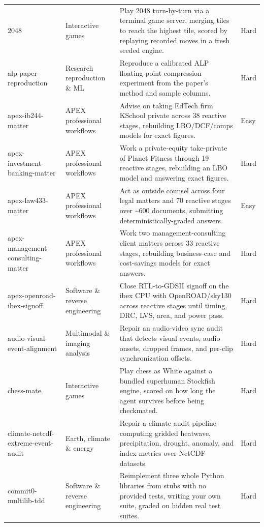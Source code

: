 \begin{longtable}{p{}p{}p{}p{}}
2048 & Interactive games & Play 2048 turn-by-turn via a terminal game server, merging tiles to reach the highest tile, scored by replaying recorded moves in a fresh seeded engine. & Hard \\
alp-paper-reproduction & Research reproduction \& ML & Reproduce a calibrated ALP floating-point compression experiment from the paper's method and sample columns. & Hard \\
apex-ib244-matter & APEX professional workflows & Advise on taking EdTech firm KSchool private across 38 reactive stages, rebuilding LBO/DCF/comps models for exact figures. & Easy \\
apex-investment-banking-matter & APEX professional workflows & Work a private-equity take-private of Planet Fitness through 19 reactive stages, rebuilding an LBO model and answering exact figures. & Hard \\
apex-law433-matter & APEX professional workflows & Act as outside counsel across four legal matters and 70 reactive stages over \textasciitilde{}600 documents, submitting deterministically-graded answers. & Easy \\
apex-management-consulting-matter & APEX professional workflows & Work two management-consulting client matters across 33 reactive stages, rebuilding business-case and cost-savings models for exact answers. & Hard \\
apex-openroad-ibex-signoff & Software \& reverse engineering & Close RTL-to-GDSII signoff on the ibex CPU with OpenROAD/sky130 across reactive stages until timing, DRC, LVS, area, and power pass. & Hard \\
audio-visual-event-alignment & Multimodal \& imaging analysis & Repair an audio-video sync audit that detects visual events, audio onsets, dropped frames, and per-clip synchronization offsets. & Hard \\
chess-mate & Interactive games & Play chess as White against a bundled superhuman Stockfish engine, scored on how long the agent survives before being checkmated. & Hard \\
climate-netcdf-extreme-event-audit & Earth, climate \& energy & Repair a climate audit pipeline computing gridded heatwave, precipitation, drought, anomaly, and index metrics over NetCDF datasets. & Hard \\
commit0-multilib-tdd & Software \& reverse engineering & Reimplement three whole Python libraries from stubs with no provided tests, writing your own suite, graded on hidden real test suites. & Hard \\

\end{longtable}
